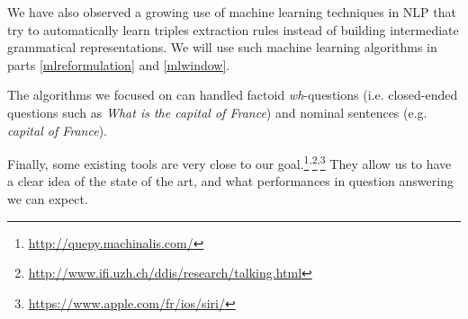We have also observed a growing use of machine learning techniques in NLP that try to automatically learn triples extraction rules instead of building intermediate grammatical representations. We will use such machine learning algorithms in parts \ref{mlreformulation} and \ref{mlwindow}.

The algorithms we focused on can handled factoid \textit{wh}-questions (i.e. closed-ended questions such as \textit{What is the capital of France}) and nominal sentences (e.g. \textit{capital of France}). 

Finally, some existing tools are very close to our goal.\footnote{\url{http://quepy.machinalis.com/}}\textsuperscript{,}\footnote{\url{http://www.ifi.uzh.ch/ddis/research/talking.html}}\textsuperscript{,}\footnote{\url{https://www.apple.com/fr/ios/siri/}} They allow us to have a clear idea of the state of the art, and what performances in question answering we can expect.